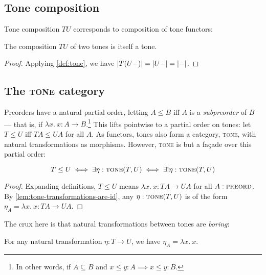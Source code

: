 \documentclass{rntz}
\newcommand{\fn}{\lambda}
\newcommand{\binder}{.~}
\newcommand{\bind}[1]{{#1}\binder}
\newcommand{\fnof}[1]{\fn\bind{#1}}
\newcommand{\cat}[1]{\textsc{#1}} %
\newcommand{\Pre}{\cat{preord}}
\newcommand{\Tone}{\cat{tone}}
\newcommand{\Cat}{\cat{cat}}
\begin{document}


\subsection{Tone composition}

Tone composition $TU$ corresponds to composition of tone functors:

\begin{theorem}
  The composition $TU$ of two tones is itself a tone.
\end{theorem}

\begin{proof} Applying \cref{def:tone}, we have
  \( |{T(U-)}| = |{U-}| = |{-}| \).
\end{proof}


\subsection{The \Tone{} category}

Preorders have a natural partial order, letting $A \le B$ iff $A$ is a
\emph{subpreorder} of $B$ --- that is, if $\fnof{x} x : A \to B$.\footnote{In
  other words, if $A \subseteq B$ and $x \le y : A \implies x \le y : B$.}
%
This lifts pointwise to a partial order on tones: let $T \le U$ iff
$TA \le UA$ for all $A$.
%
As functors, tones also form a category, \Tone{}, with natural transformations
as morphisms. However, \Tone{} is but a fa\c{c}ade over this partial order:

\begin{theorem} \label{thm:tone-poset}
  \[T \le U \iff \exists \eta : \Tone(T, U) \iff \exists! \eta : \Tone(T,U)\]
\end{theorem}

\begin{proof}
  Expanding definitions, $T \le U$ means $\fnof{x} x : TA \to
  UA$ for all $A : \Pre$. By \cref{lem:tone-transformations-are-id},
  any $\eta : \Tone(T,U)$ is of the form $\eta_A = \fnof{x} x : TA
  \to UA$.
\end{proof}

The crux here is that natural transformations between tones are \emph{boring}:
\begin{lemma}\label{lem:tone-transformations-are-id}
  For any natural transformation $\eta : T \to U$, we have $\eta_A = \fnof{x}
  x$.
\end{lemma}
\end{document}
